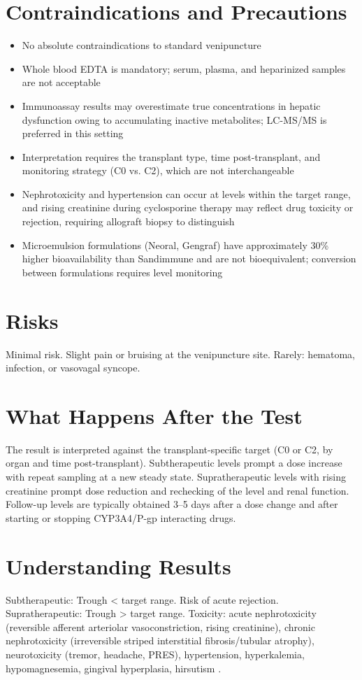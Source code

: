 \section*{Contraindications and Precautions}
\begin{itemize}
  \item No absolute contraindications to standard venipuncture
  \item Whole blood EDTA is mandatory; serum, plasma, and heparinized samples are not acceptable
  \item Immunoassay results may overestimate true concentrations in hepatic dysfunction owing to accumulating inactive metabolites; LC-MS/MS is preferred in this setting
  \item Interpretation requires the transplant type, time post-transplant, and monitoring strategy (C0 vs. C2), which are not interchangeable
  \item Nephrotoxicity and hypertension can occur at levels within the target range, and rising creatinine during cyclosporine therapy may reflect drug toxicity or rejection, requiring allograft biopsy to distinguish
  \item Microemulsion formulations (Neoral, Gengraf) have approximately 30\% higher bioavailability than Sandimmune and are not bioequivalent; conversion between formulations requires level monitoring
\end{itemize}

\section*{Risks}
Minimal risk. Slight pain or bruising at the venipuncture site. Rarely: hematoma, infection, or vasovagal syncope.

\section*{What Happens After the Test}
The result is interpreted against the transplant-specific target (C0 or C2, by organ and time post-transplant). Subtherapeutic levels prompt a dose increase with repeat sampling at a new steady state. Supratherapeutic levels with rising creatinine prompt dose reduction and rechecking of the level and renal function. Follow-up levels are typically obtained 3--5 days after a dose change and after starting or stopping CYP3A4/P-gp interacting drugs.

\section*{Understanding Results}
Subtherapeutic: Trough < target range. Risk of acute rejection. Supratherapeutic: Trough > target range. Toxicity: acute nephrotoxicity (reversible afferent arteriolar vasoconstriction, rising creatinine), chronic nephrotoxicity (irreversible striped interstitial fibrosis/tubular atrophy), neurotoxicity (tremor, headache, PRES), hypertension, hyperkalemia, hypomagnesemia, gingival hyperplasia, hirsutism \cite{naesens2009calcineurin}.

